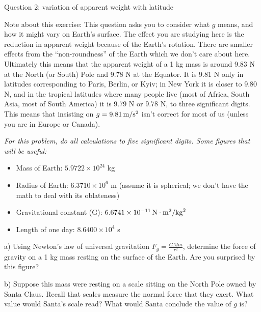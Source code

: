 \documentclass[12pt]{article}
\newcommand{\BI}{\begin{itemize}}
\newcommand{\EI}{\end{itemize}}
\begin{document}
\newpage

\centerline{\Large Question 2: variation of apparent weight with latitude}

\medskip

{\footnotesize Note about this exercise: This question asks you to consider what $g$ means, and how it might vary on Earth's surface. The effect you are studying here is the reduction in apparent weight because of the Earth's rotation. There are smaller effects from the ``non-roundness'' of the Earth which we don't care about here. Ultimately this means that the apparent weight of a 1 kg mass is around 9.83 N at the North (or South) Pole and 9.78 N at the Equator. It is 9.81 N only in latitudes corresponding to Paris, Berlin, or Kyiv; in New York it is closer to 9.80 N, and in the tropical latitudes where many people live (most of Africa, South Asia, most of South America) it is 9.79 N or 9.78 N, to three significant digits. This means that insisting on $g=9.81\,\rm m/\rm s^2$ isn't correct for most of us (unless you are in Europe or Canada).
}


\it For this problem, do all calculations to five significant digits. Some figures that will be useful:

\rm
\BI
\item Mass of Earth: $5.9722\times 10^{24}$ kg
\item Radius of Earth: $ 6.3710 \times 10^6$ m (assume it is spherical; we don't have the math to deal with its oblateness)
\item Gravitational constant (G): $6.6741 \times 10^{-11} \,\rm N\cdot \rm m^2/{\rm kg}^2$
\item Length of one day: $8.6400 \times 10^4$ s
\EI


a) Using Newton's law of universal gravitation $F_g=\frac{GMm}{r^2}$, determine the force of gravity on a 1 kg mass resting on the surface of the Earth. Are you surprised by this figure?
%
\vspace{2in}

b) Suppose this mass were resting on a scale sitting on the North Pole owned by Santa Claus. Recall that scales measure
the normal force that they exert. What value would Santa's scale read? What would Santa conclude the value of $g$ is?
%
%
\end{document}

